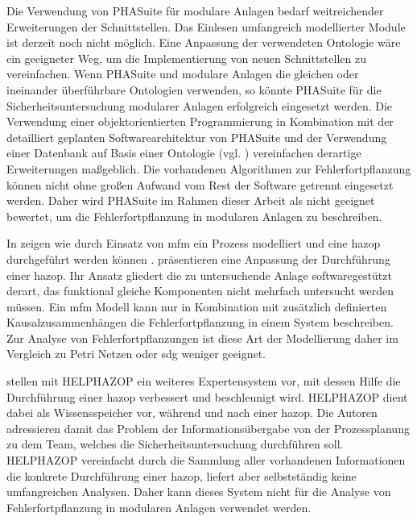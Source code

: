 Die Verwendung von PHASuite f\"ur modulare Anlagen bedarf weitreichender Erweiterungen der Schnittstellen. Das Einlesen umfangreich modellierter Module ist derzeit noch nicht m\"oglich. Eine Anpassung der verwendeten Ontologie w\"are ein geeigneter Weg, um die Implementierung von neuen Schnittstellen zu vereinfachen. Wenn PHASuite und modulare Anlagen die gleichen oder ineinander \"uberf\"uhrbare Ontologien verwenden, so k\"onnte PHASuite f\"ur die Sicherheitsuntersuchung modularer Anlagen erfolgreich eingesetzt werden. Die Verwendung einer objektorientierten Programmierung in Kombination mit der detailliert geplanten Softwarearchitektur von PHASuite und der Verwendung einer Datenbank auf Basis einer Ontologie {(vgl. \cite{Zhao_2005a})} vereinfachen derartige Erweiterungen ma\ss{}geblich. Die vorhandenen Algorithmen zur Fehlerfortpflanzung k\"onnen nicht ohne gro\ss{}en Aufwand vom Rest der Software getrennt eingesetzt werden. Daher wird PHASuite im Rahmen dieser Arbeit als nicht geeignet bewertet, um die Fehlerfortpflanzung in modularen Anlagen zu beschreiben.

In  zeigen \citeauthor{Rossing_2010} wie durch Einsatz von \ac{mfm} ein Prozess modelliert und eine \ac{hazop} durchgef\"uhrt werden k\"onnen \cite{Rossing_2010}. \citeauthor{Rossing_2010} pr\"asentieren eine Anpassung der Durchf\"uhrung einer \ac{hazop}. Ihr Ansatz gliedert die zu untersuchende Anlage softwaregest\"utzt derart, das funktional gleiche Komponenten nicht mehrfach untersucht werden m\"ussen. Ein \ac{mfm} Modell kann nur in Kombination mit zus\"atzlich definierten Kausalzusammenh\"angen die Fehlerfortpflanzung in einem System beschreiben. Zur Analyse von Fehlerfortpflanzungen ist diese Art der Modellierung daher im Vergleich zu Petri Netzen oder \ac{sdg} weniger geeignet.

\citeauthor{Wang_2012} stellen mit HELPHAZOP ein weiteres Expertensystem vor, mit dessen Hilfe die Durchf\"uhrung einer \ac{hazop} verbessert und beschleunigt wird. HELPHAZOP dient dabei als Wissensspeicher vor, w\"ahrend und nach einer \ac{hazop}. Die Autoren adressieren damit das Problem der Informations\"ubergabe von der Prozessplanung zu dem Team, welches die Sicherheitsuntersuchung durchf\"uhren soll. HELPHAZOP vereinfacht durch die Sammlung aller vorhandenen Informationen die konkrete Durchf\"uhrung einer \ac{hazop}, liefert aber selbstst\"andig keine umfangreichen Analysen. Daher kann dieses System nicht f\"ur die Analyse von Fehlerfortpflanzung in modularen Anlagen verwendet werden. 


